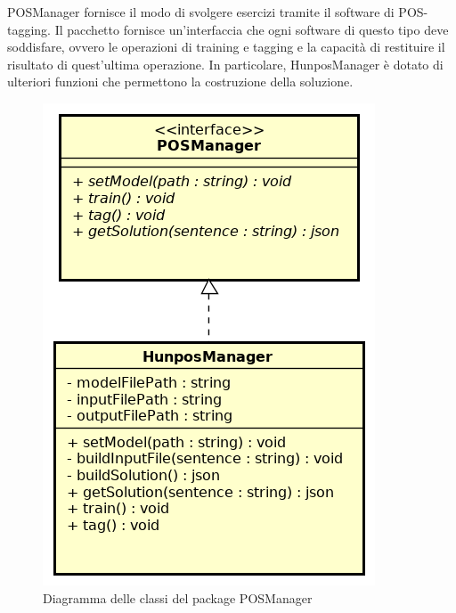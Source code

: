 POSManager fornisce il modo di svolgere esercizi tramite il software di POS-tagging. Il pacchetto fornisce un'interfaccia che ogni software di questo tipo deve soddisfare, ovvero le operazioni di training e tagging e la capacità di restituire il risultato di quest'ultima operazione. In particolare, HunposManager è dotato di ulteriori funzioni che permettono la costruzione della soluzione. 

\begin{figure}[ht]
	\centering
	\includegraphics[scale=0.5]{images/POSManager.png}
	\caption{Diagramma delle classi del package POSManager}
\end{figure}